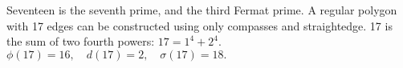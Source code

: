 Seventeen is the seventh prime, and the third Fermat prime.
  A regular polygon with 17 edges can be constructed using only
  compasses and straightedge.
  17 is the sum of two fourth powers: $17=1^{4}+2^{4}.$ 
  $ \phi(17)=16, \quad d(17)=2, \quad \sigma(17)=18 . $